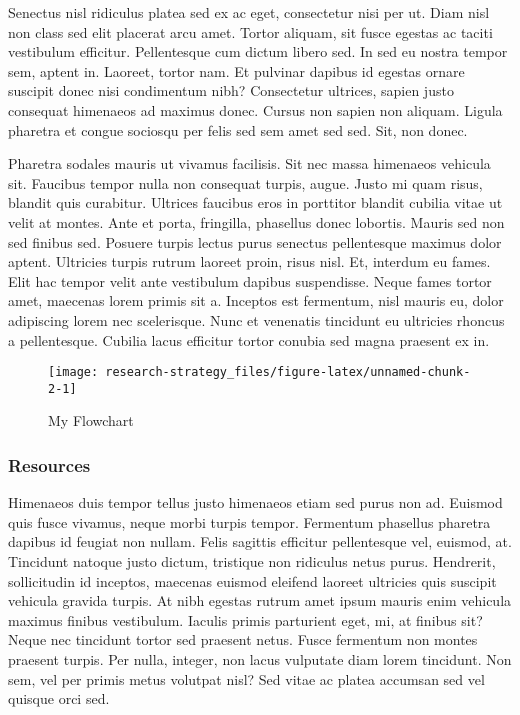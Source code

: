 \documentclass[11pt,]{article}
\begin{document}
Senectus nisl ridiculus platea sed ex ac eget, consectetur nisi per ut.
Diam nisl non class sed elit placerat arcu amet. Tortor aliquam, sit
fusce egestas ac taciti vestibulum efficitur. Pellentesque cum dictum
libero sed. In sed eu nostra tempor sem, aptent in. Laoreet, tortor nam.
Et pulvinar dapibus id egestas ornare suscipit donec nisi condimentum
nibh? Consectetur ultrices, sapien justo consequat himenaeos ad maximus
donec. Cursus non sapien non aliquam. Ligula pharetra et congue sociosqu
per felis sed sem amet sed sed. Sit, non donec.

Pharetra sodales mauris ut vivamus facilisis. Sit nec massa himenaeos
vehicula sit. Faucibus tempor nulla non consequat turpis, augue. Justo
mi quam risus, blandit quis curabitur. Ultrices faucibus eros in
porttitor blandit cubilia vitae ut velit at montes. Ante et porta,
fringilla, phasellus donec lobortis. Mauris sed non sed finibus sed.
Posuere turpis lectus purus senectus pellentesque maximus dolor aptent.
Ultricies turpis rutrum laoreet proin, risus nisl. Et, interdum eu
fames. Elit hac tempor velit ante vestibulum dapibus suspendisse. Neque
fames tortor amet, maecenas lorem primis sit a. Inceptos est fermentum,
nisl mauris eu, dolor adipiscing lorem nec scelerisque. Nunc et
venenatis tincidunt eu ultricies rhoncus a pellentesque. Cubilia lacus
efficitur tortor conubia sed magna praesent ex in.

\begin{wrapfigure}{R}{0.3\textwidth}

\hfill{}\texttt{[image: research-strategy\_files/figure-latex/unnamed-chunk-2-1]} 

\caption{My Flowchart}\label{fig:unnamed-chunk-2}
\end{wrapfigure}

\hypertarget{resources}{%
\subsubsection{Resources}\label{resources}}

Himenaeos duis tempor tellus justo himenaeos etiam sed purus non ad.
Euismod quis fusce vivamus, neque morbi turpis tempor. Fermentum
phasellus pharetra dapibus id feugiat non nullam. Felis sagittis
efficitur pellentesque vel, euismod, at. Tincidunt natoque justo dictum,
tristique non ridiculus netus purus. Hendrerit, sollicitudin id
inceptos, maecenas euismod eleifend laoreet ultricies quis suscipit
vehicula gravida turpis. At nibh egestas rutrum amet ipsum mauris enim
vehicula maximus finibus vestibulum. Iaculis primis parturient eget, mi,
at finibus sit? Neque nec tincidunt tortor sed praesent netus. Fusce
fermentum non montes praesent turpis. Per nulla, integer, non lacus
vulputate diam lorem tincidunt. Non sem, vel per primis metus volutpat
nisl? Sed vitae ac platea accumsan sed vel quisque orci sed.
\end{document}

